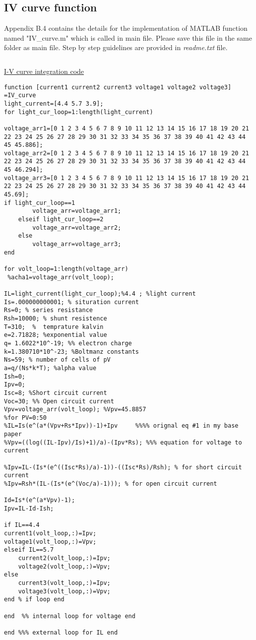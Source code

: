 \newpage
\subsection{IV curve function}
\label{iv1}
Appendix B.4 contains the details for the implementation of MATLAB function named "IV\_curve.m" which is called in main file. Please save this file in the same folder as main file. Step by step guidelines are provided in \textit{readme.txt} file.\par

\begin{linenumbers}
\begin{lstlisting}

\end{lstlisting}
\hypertarget{iv_code}{}
\hyperlink{iv_text}{I-V curve integration code}
\begin{lstlisting}
function [current1 current2 current3 voltage1 voltage2 voltage3] =IV_curve
light_current=[4.4 5.7 3.9];
for light_cur_loop=1:length(light_current)

voltage_arr1=[0 1 2 3 4 5 6 7 8 9 10 11 12 13 14 15 16 17 18 19 20 21 22 23 24 25 26 27 28 29 30 31 32 33 34 35 36 37 38 39 40 41 42 43 44 45 45.886];
voltage_arr2=[0 1 2 3 4 5 6 7 8 9 10 11 12 13 14 15 16 17 18 19 20 21 22 23 24 25 26 27 28 29 30 31 32 33 34 35 36 37 38 39 40 41 42 43 44 45 46.294];
voltage_arr3=[0 1 2 3 4 5 6 7 8 9 10 11 12 13 14 15 16 17 18 19 20 21 22 23 24 25 26 27 28 29 30 31 32 33 34 35 36 37 38 39 40 41 42 43 44 45.69];
if light_cur_loop==1
        voltage_arr=voltage_arr1;
    elseif light_cur_loop==2
        voltage_arr=voltage_arr2;
    else
        voltage_arr=voltage_arr3;
end

for volt_loop=1:length(voltage_arr)
 %acha1=voltage_arr(volt_loop);

IL=light_current(light_cur_loop);%4.4 ; %light current
Is=.000000000001; % situration current
Rs=0; % series resistance
Rsh=10000; % shunt resistence
T=310;  %  temprature kalvin
e=2.71828; %exponential value
q= 1.6022*10^-19; %% electron charge
k=1.380710*10^-23; %Boltmanz constants
Ns=59; % number of cells of pV
a=q/(Ns*k*T); %alpha value
Ish=0;
Ipv=0;
Isc=8; %Short circuit current
Voc=30; %% Open circuit current
Vpv=voltage_arr(volt_loop); %Vpv=45.8857
%for PV=0:50
%IL=Is(e^(a*(Vpv+Rs*Ipv))-1)+Ipv     %%%% orignal eq #1 in my base paper
%Vpv=((log((IL-Ipv)/Is)+1)/a)-(Ipv*Rs); %%% equation for voltage to current

%Ipv=IL-(Is*(e^((Isc*Rs)/a)-1))-((Isc*Rs)/Rsh); % for short circuit current
%Ipv=Rsh*(IL-(Is*(e^(Voc/a)-1))); % for open circuit current

Id=Is*(e^(a*Vpv)-1);
Ipv=IL-Id-Ish;

if IL==4.4
current1(volt_loop,:)=Ipv;
voltage1(volt_loop,:)=Vpv;
elseif IL==5.7
    current2(volt_loop,:)=Ipv;
    voltage2(volt_loop,:)=Vpv;
else
    current3(volt_loop,:)=Ipv;
    voltage3(volt_loop,:)=Vpv;
end % if loop end

end  %% internal loop for voltage end

end %%% external loop for IL end

\end{lstlisting}
\end{linenumbers} 